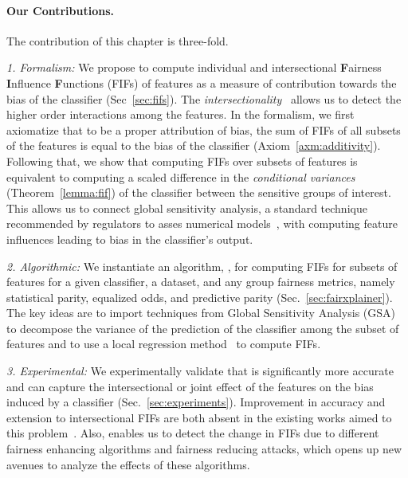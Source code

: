 \paragraph{Our Contributions.} The contribution of this chapter is three-fold.

\textit{1. Formalism:} We propose to compute individual and intersectional \textbf{F}airness \textbf{I}nfluence \textbf{F}unctions (FIFs) of features as a measure of contribution towards the bias of the classifier (Sec~\ref{sec:fifs}). The \textit{intersectionality}~\cite{buolamwini2018gender} allows us to detect the higher order interactions among the features. In the formalism, we first axiomatize that to be a proper attribution of bias, the sum of FIFs of all subsets of the features is equal to the bias of the classifier (Axiom~\ref{axm:additivity}). Following that, we show that computing FIFs over subsets of features is equivalent to computing a scaled difference in the \emph{conditional variances} (Theorem~\ref{lemma:fif}) of the classifier between the sensitive groups of interest. This allows us to connect global sensitivity analysis, a standard technique recommended by regulators to asses numerical models~\cite{eu,usepa}, with computing feature influences leading to bias in the classifier's output.%

\textit{2. Algorithmic:} We instantiate an algorithm, {\fairXplainer}, for computing FIFs for subsets of features for a given classifier, a dataset, and any group fairness metrics, namely statistical parity, equalized odds, and predictive parity (Sec.~\ref{sec:fairxplainer}).  The key ideas are to import techniques from Global Sensitivity Analysis (GSA)~\cite{saltelli2008global} to decompose the variance of the prediction of the classifier among the subset of features and to use a local regression method~\cite{loader2006local} to compute FIFs. 

\textit{3. Experimental:} We experimentally validate that {\fairXplainer} is significantly more accurate and can capture the intersectional or joint effect of the features on the bias induced by a classifier (Sec.~\ref{sec:experiments}). Improvement in accuracy and extension to intersectional FIFs are both absent in the existing works aimed to this problem~\cite{begley2020explainability,lundberg2020explaining}. Also, {\fairXplainer} enables us to detect the change in FIFs due to different fairness enhancing algorithms and fairness reducing attacks, which opens up new avenues to analyze the effects of these algorithms. 

